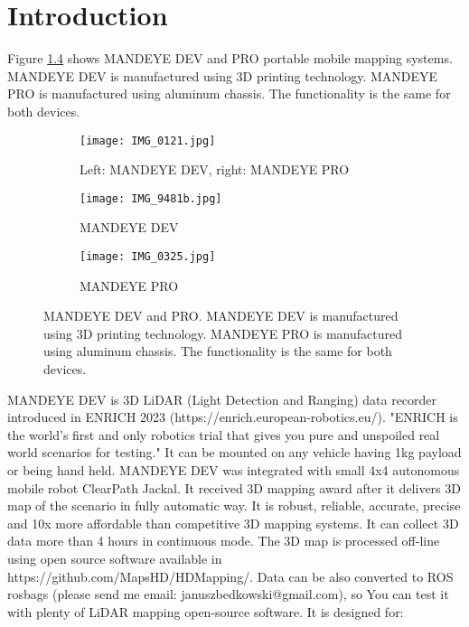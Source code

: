 \chapter{Introduction}

Figure \ref{fig:1abcd} shows MANDEYE DEV and PRO portable mobile mapping systems.
MANDEYE DEV is manufactured using 3D printing technology.
MANDEYE PRO is manufactured using aluminum chassis.
The functionality is the same for both devices. 

\begin{figure}
	\centering
	\begin{subfigure}[b]{0.8\textwidth}
		\centering
		\texttt{[image: IMG\_0121.jpg]}
		\caption{Left: MANDEYE DEV, right: MANDEYE PRO}
		\label{fig:1a}
	\end{subfigure}
	\hfill
	\begin{subfigure}[b]{0.4\textwidth}
		\centering
		\texttt{[image: IMG\_9481b.jpg]}
		\caption{MANDEYE DEV}
		\label{fig:1b}
	\end{subfigure}
	\hfill
	\begin{subfigure}[b]{0.535\textwidth}
		\centering
		\texttt{[image: IMG\_0325.jpg]}
		\caption{MANDEYE PRO}
		\label{fig:1c}
	\end{subfigure}
	\caption{MANDEYE DEV and PRO. MANDEYE DEV is manufactured using 3D printing technology.
		MANDEYE PRO is manufactured using aluminum chassis.
		The functionality is the same for both devices. }
	\label{fig:1abcd}
\end{figure}




MANDEYE DEV is 3D LiDAR (Light Detection and Ranging) data recorder introduced in ENRICH 2023 (https://enrich.european-robotics.eu/).
"ENRICH is the world's first and only robotics trial that gives you pure and unspoiled real world scenarios for testing." 
It can be mounted on any vehicle having 1kg payload or being hand held. 
MANDEYE DEV was integrated with small 4x4 autonomous mobile robot ClearPath Jackal. 
It received 3D mapping award after it delivers 3D map of the scenario in fully automatic way. 
It is robust, reliable, accurate, precise and 10x more affordable than competitive 3D mapping systems.
It can collect 3D data more than 4 hours in continuous mode.
The 3D map is processed off-line using open source software available in https://github.com/MapsHD/HDMapping/.
Data can be also converted to ROS rosbags (please send me email: januszbedkowski@gmail.com), so You can test it with plenty of LiDAR mapping open-source software.
It is designed for:

